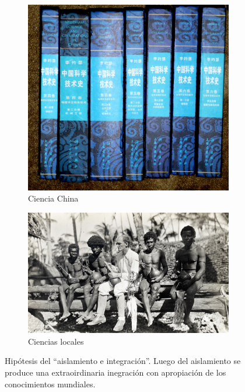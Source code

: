 \documentclass[a4paper,10pt]{book}
\newif\ifes
\newcommand{\es}[1]{\ifes#1\fi}
\begin{document}
\es{Ninguna de estas propuestas incorpora en su análisis la situación de aislamiento que sufre europa occidental en la etapa previa ni la situación de interconexión mundial posterior.}%
%
\es{La explicaciones de ``aislamiento e integración'' permiten explicar tanto el proceso de involución cultural que sufre la sociedad europea durante su ``edad media'' como la aceleración del proceso de evolución cultural que vive el mundo moderno.}%
%
\begin{figure}[ht!]
    \centering
    \begin{subfigure}[b]{0.25\textwidth}
    \centering
    \includegraphics[width=\linewidth]{static/scienceAndCivilizationChina}
    \caption{Ciencia China}
    \label{}
    \end{subfigure}
    \begin{subfigure}[b]{0.35\textwidth}
    \centering
    \includegraphics[width=\linewidth]{static/malinowsky}
    \caption{Ciencias locales}
    \label{}
    \end{subfigure}
    \caption{Hipótesis del ``aislamiento e integración''. Luego del aislamiento se produce una extraoirdinaria inegración con apropiación de los conocimientos mundiales.}
    \label{fig:mito}
\end{figure}
\end{document}
